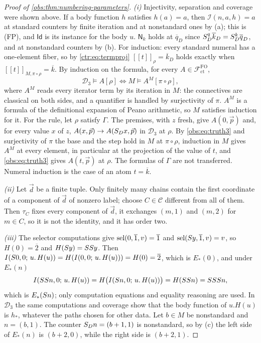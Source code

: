 \begin{proof}[Proof of \cref{obs:thm:numbering-parameters}]
\emph{(i)} Injectivity, separation and coverage were shown above. If a body
function $h$ satisfies $h(a)=a$, then $\mathcal{I}(n,a,h)=a$ at standard
counters by finite iteration and at nonstandard ones by (a); this is (FP), and
$\mathsf{Id}$ is its instance for the body $u$. $\mathsf{N}_k$ holds at
$\overline{q}_D$ since $S_D^{q}\overline{k}_D=S_D^{k}\overline{q}_D$, and
at nonstandard counters by (b). For induction: every standard numeral has a
one-element fiber, so by \eqref{ctr:eq:termproj}
$[\![t]\!]_\rho=\overline{k}_D$ holds exactly when
$[\![t]\!]_{M,\pi\circ\rho}=\overline{k}$. By induction on the formula, for every
$A\in\mathcal{F}^{\mathrm{FO}}_{\mathrm{ct}}$,
\begin{equation}
\label{obs:eq:truth3}
\mathcal{D}_3\models A[\rho]\iff M\models A^{M}[\pi\circ\rho],
\end{equation}
where $A^{M}$ reads every iterator term by its iteration in $M$: the
connectives are classical on both sides, and a quantifier is handled by
surjectivity of $\pi$. $A^{M}$ is a formula of the definitional expansion of
Peano arithmetic, so $M$ satisfies induction for it. For the rule, let $\rho$
satisfy $\Gamma$. The premises, with $z$ fresh, give $A(0,\vec p)$ and, for every
value $x$ of $z$, $A(x,\vec p)\to A(S_Dx,\vec p)$ in $\mathcal{D}_3$ at
$\rho$. By \eqref{obs:eq:truth3} and surjectivity of $\pi$ the base and the step
hold in $M$ at $\pi\circ\rho$, induction in $M$ gives $A^{M}$ at every element,
in particular at the projection of the value of $t$, and \eqref{obs:eq:truth3}
gives $A(t,\vec p)$ at $\rho$. The formulas of $\Gamma$ are not transferred.
Numeral induction is the case of an atom $t=\overline{k}$.

\emph{(ii)} Let $\vec d$ be a finite tuple. Only finitely many chains contain the
first coordinate of a component of $\vec d$ of nonzero label; choose
$C\in\mathcal{C}$ different from all of them. Then $\tau_C$ fixes every
component of $\vec d$, it exchanges $(m,1)$ and $(m,2)$ for $m\in C$, so it is
not the identity, and it has order two.

\emph{(iii)} The selector computations give $\operatorname{sel}(0,\overline{1},v)=\overline{1}$
and $\operatorname{sel}(S y,\overline{1},v)=v$, so $H(0)=\overline{2}$ and
$H(S y)=SS y$. Then
$I(S 0,0;\,u.\,H(u))=H(I(0,0;\,u.\,H(u)))=H(0)=\overline{2}$, which is
$E_{*}(0)$, and under $E_{*}(n)$
\[
I(SS n,0;\,u.\,H(u))=H\bigl(I(S n,0;\,u.\,H(u))\bigr)
=H(SS n)=SSS n,
\]
which is $E_{*}(S n)$; only computation equations and equality reasoning are
used. In $\mathcal{D}_3$ the same computations and coverage show that the body
function of $u.H(u)$ is $h_{*}$, whatever the paths chosen for other data. Let
$b\in M$ be nonstandard and $n=(b,1)$. The counter $S_Dn=(b+1,1)$ is
nonstandard, so by (c) the left side of $E_{*}(n)$ is $(b+2,0)$, while the
right side is $(b+2,1)$.


\end{proof}
